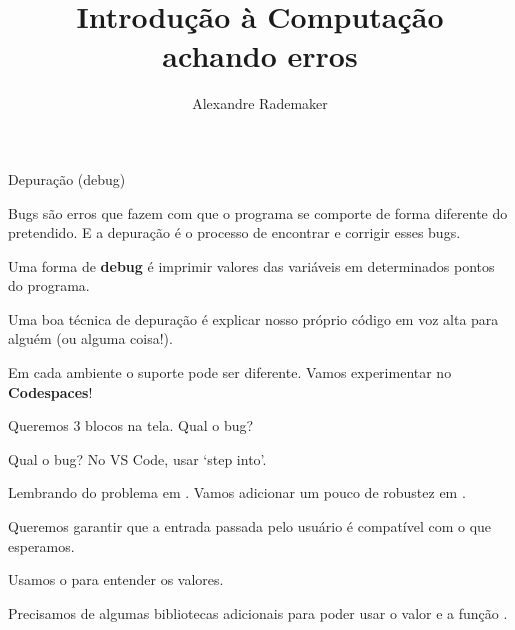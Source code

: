 \documentclass{beamer}
\title{Introdução à Computação \\ achando erros}
\author{Alexandre Rademaker}
\date{}
\begin{document}
\begin{frame}
 \maketitle
\end{frame}



\begin{frame}{Depuração (debug)}

  Bugs são erros que fazem com que o programa se comporte de forma
  diferente do pretendido. E a depuração é o processo de encontrar e
  corrigir esses bugs.

  Uma forma de \textbf{debug} é imprimir valores das variáveis em
  determinados pontos do programa.  

  Uma boa técnica de depuração é explicar nosso próprio código em voz
  alta para alguém (ou alguma coisa!).

  Em cada ambiente o suporte pode ser diferente. Vamos experimentar no
  \textbf{Codespaces}!

  \framebreak

  Queremos 3 blocos na tela. Qual o bug?

  

  \framebreak

  Qual o bug? No VS Code, usar `step into'.

  

  \framebreak

  Lembrando do problema em . Vamos
  adicionar um pouco de robustez em .

  Queremos garantir que a entrada passada pelo usuário é compatível
  com o que esperamos.

  Usamos o  para entender os valores.

  Precisamos de algumas bibliotecas adicionais para poder usar o valor
   e a função .
  
  \framebreak

  


\end{frame}
\end{document}
